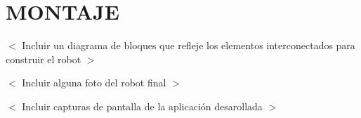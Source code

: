 
\chapter{MONTAJE}

$<$ Incluir un diagrama de bloques que refleje los elementos interconectados para construir el robot $>$

$<$ Incluir alguna foto del robot final $>$

$<$ Incluir capturas de pantalla de la aplicación desarollada $>$
